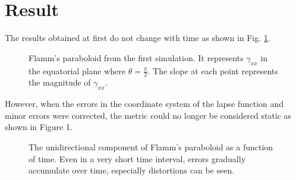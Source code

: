 \section{Result}

The results obtained at first do not change with time as shown in Fig. \ref{fig:0_data0}.
\begin{figure}[H]
	\centering
	
	\caption{Flamm's paraboloid from the first simulation. It represents $\gamma_{xx}$ in the equatorial plane where $\theta = \frac{\pi}{2}$. The slope at each point represents the magnitude of $\gamma_{xx}$.}
	\label{fig:0_data0}
\end{figure}

However, when the errors in the coordinate system of the lapse function and minor errors were corrected, the metric could no longer be considered static as shown in Figure 1.

\begin{figure}[H]
	\centering
	
	\caption{The unidirectional component of Flamm's paraboloid as a function of time. Even in a very short time interval, errors gradually accumulate over time, especially distortions can be seen.}
	\label{fig:data_by_time}
\end{figure}


